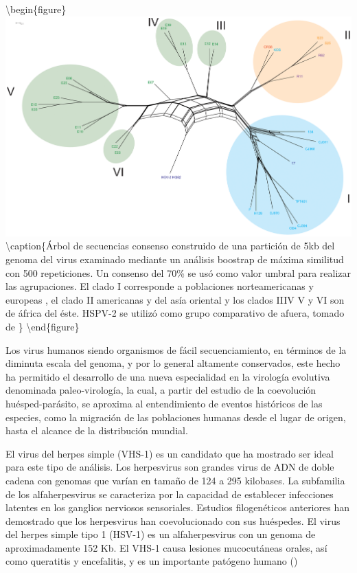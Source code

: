 \documentclass[
  12pt, krantz2,
  spanish,
]{krantz}
\begin{document}
\textbackslash begin\{figure\}
\includegraphics[width=0.8\linewidth]{figures/VHS1} \textbackslash caption\{Árbol de secuencias consenso construido de una partición de 5kb del genoma del virus examinado mediante un análisis boostrap de máxima similitud con 500 repeticiones. Un consenso del 70\% se usó como valor umbral para realizar las agrupaciones. El clado I corresponde a poblaciones norteamericanas y europeas , el clado II americanas y del asía oriental y los clados IIIV V y VI son de áfrica del éste. HSPV-2 se utilizó como grupo comparativo de afuera, tomado de \citet{kolb2013using}\}\label{fig:sixclades}
\textbackslash end\{figure\}

Los virus humanos siendo organismos de fácil secuenciamiento, en términos de la diminuta escala del genoma, y por lo general altamente conservados, este hecho ha permitido el desarrollo de una nueva especialidad en la virología evolutiva denominada paleo-virología, la cual, a partir del estudio de la coevolución huésped-parásito, se aproxima al entendimiento de eventos históricos de las especies, como la migración de las poblaciones humanas desde el lugar de origen, hasta el alcance de la distribución mundial.

El virus del herpes simple (VHS-1) es un candidato que ha mostrado ser ideal para este tipo de análisis. Los herpesvirus son grandes virus de ADN de doble cadena con genomas que varían en tamaño de 124 a 295 kilobases. La subfamilia de los alfaherpesvirus se caracteriza por la capacidad de establecer infecciones latentes en los ganglios nerviosos sensoriales. Estudios filogenéticos anteriores han demostrado que los herpesvirus han coevolucionado con sus huéspedes. El virus del herpes simple tipo 1 (HSV-1) es un alfaherpesvirus con un genoma de aproximadamente 152 Kb. El VHS-1 causa lesiones mucocutáneas orales, así como queratitis y encefalitis, y es un importante patógeno humano (\citet{kolb2013using})
\end{document}
